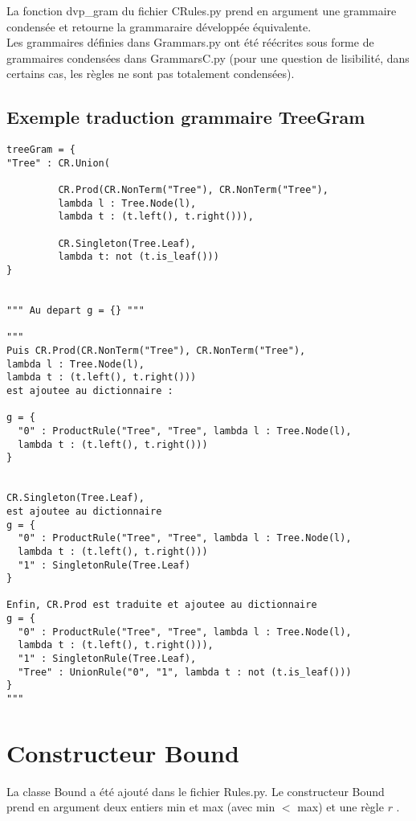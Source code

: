 \documentclass[a4paper, titlepage]{article}
\begin{document}
\begin{itemize}
La fonction dvp\_gram du fichier CRules.py prend en argument une
grammaire condensée et retourne la grammaraire développée
équivalente.\\

Les grammaires définies dans Grammars.py ont été réécrites sous forme
de grammaires condensées dans GrammarsC.py (pour une question de
lisibilité, dans certains cas, les règles ne sont pas totalement
condensées).
\pagebreak
\subsection{Exemple traduction grammaire TreeGram}

\begin{lstlisting}
treeGram = {
"Tree" : CR.Union(

         CR.Prod(CR.NonTerm("Tree"), CR.NonTerm("Tree"),
         lambda l : Tree.Node(l),
         lambda t : (t.left(), t.right())),

         CR.Singleton(Tree.Leaf),
         lambda t: not (t.is_leaf()))
}


""" Au depart g = {} """

"""
Puis CR.Prod(CR.NonTerm("Tree"), CR.NonTerm("Tree"),
lambda l : Tree.Node(l),
lambda t : (t.left(), t.right()))
est ajoutee au dictionnaire :
    
g = {
  "0" : ProductRule("Tree", "Tree", lambda l : Tree.Node(l),
  lambda t : (t.left(), t.right()))
}
   
    
CR.Singleton(Tree.Leaf),
est ajoutee au dictionnaire
g = {
  "0" : ProductRule("Tree", "Tree", lambda l : Tree.Node(l),
  lambda t : (t.left(), t.right()))
  "1" : SingletonRule(Tree.Leaf)
}
    
Enfin, CR.Prod est traduite et ajoutee au dictionnaire
g = {
  "0" : ProductRule("Tree", "Tree", lambda l : Tree.Node(l),
  lambda t : (t.left(), t.right())),
  "1" : SingletonRule(Tree.Leaf),
  "Tree" : UnionRule("0", "1", lambda t : not (t.is_leaf()))
}
"""              
\end{lstlisting}


\section{Constructeur Bound}

La classe Bound a été ajouté dans le fichier Rules.py. Le constructeur
Bound prend en argument deux entiers min et max (avec min $<$ max) et
une règle $r$ .\\



\end{itemize}
\end{document}
